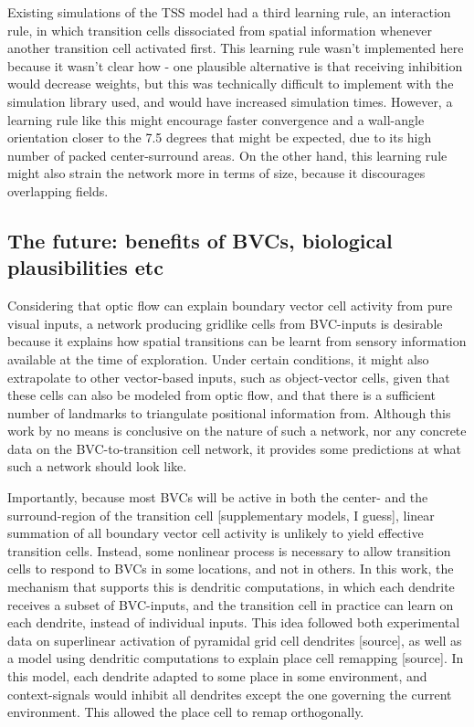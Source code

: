 \documentclass{article}
\begin{document}
    Existing simulations of the TSS model had a third learning rule, an interaction rule, in which transition cells dissociated from spatial information whenever another transition cell activated first. This learning rule wasn't implemented here because it wasn't clear how - one plausible alternative is that receiving inhibition would decrease weights, but this was technically difficult to implement with the simulation library used, and would have increased simulation times. However, a learning rule like this might encourage faster convergence and a wall-angle orientation closer to the 7.5 degrees that might be expected, due to its high number of packed center-surround areas. On the other hand, this learning rule might also strain the network more in terms of size, because it discourages overlapping fields.

    \subsection{The future: benefits of BVCs, biological plausibilities etc}

    Considering that optic flow can explain boundary vector cell activity from pure visual inputs, a network producing gridlike cells from BVC-inputs is desirable because it explains how spatial transitions can be learnt from sensory information available at the time of exploration. Under certain conditions, it might also extrapolate to other vector-based inputs, such as object-vector cells, given that these cells can also be modeled from optic flow, and that there is a sufficient number of landmarks to triangulate positional information from. Although this work by no means is conclusive on the nature of such a network, nor any concrete data on the BVC-to-transition cell network, it provides some predictions at what such a network should look like.

    Importantly, because most BVCs will be active in both the center- and the surround-region of the transition cell [supplementary models, I guess], linear summation of all boundary vector cell activity is unlikely to yield effective transition cells. Instead, some nonlinear process is necessary to allow transition cells to respond to BVCs in some locations, and not in others. In this work, the mechanism that supports this is dendritic computations, in which each dendrite receives a subset of BVC-inputs, and the transition cell in practice can learn on each dendrite, instead of individual inputs. This idea followed both experimental data on superlinear activation of pyramidal grid cell dendrites [source], as well as a model using dendritic computations to explain place cell remapping [source]. In this model, each dendrite adapted to some place in some environment, and context-signals would inhibit all dendrites except the one governing the current environment. This allowed the place cell to remap orthogonally.
\end{document}
